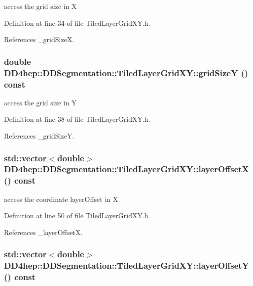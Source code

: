 access the grid size in X 

Definition at line 34 of file TiledLayerGridXY.h.

References \_\-gridSizeX.\hypertarget{class_d_d4hep_1_1_d_d_segmentation_1_1_tiled_layer_grid_x_y_a1e3d5ba29ff7da392441b974bc6c2c44}{
\subsubsection[{gridSizeY}]{\setlength{\rightskip}{0pt plus 5cm}double DD4hep::DDSegmentation::TiledLayerGridXY::gridSizeY () const}}
\label{class_d_d4hep_1_1_d_d_segmentation_1_1_tiled_layer_grid_x_y_a1e3d5ba29ff7da392441b974bc6c2c44}


access the grid size in Y 

Definition at line 38 of file TiledLayerGridXY.h.

References \_\-gridSizeY.\hypertarget{class_d_d4hep_1_1_d_d_segmentation_1_1_tiled_layer_grid_x_y_a6f4a84bfe3765e5c55b53b31996e2758}{
\subsubsection[{layerOffsetX}]{\setlength{\rightskip}{0pt plus 5cm}std::vector$<$double$>$ DD4hep::DDSegmentation::TiledLayerGridXY::layerOffsetX () const}}
\label{class_d_d4hep_1_1_d_d_segmentation_1_1_tiled_layer_grid_x_y_a6f4a84bfe3765e5c55b53b31996e2758}


access the coordinate layerOffset in X 

Definition at line 50 of file TiledLayerGridXY.h.

References \_\-layerOffsetX.\hypertarget{class_d_d4hep_1_1_d_d_segmentation_1_1_tiled_layer_grid_x_y_a805628a8e85ce9859fb86c64dfa45640}{
\subsubsection[{layerOffsetY}]{\setlength{\rightskip}{0pt plus 5cm}std::vector$<$double$>$ DD4hep::DDSegmentation::TiledLayerGridXY::layerOffsetY () const}}
\label{class_d_d4hep_1_1_d_d_segmentation_1_1_tiled_layer_grid_x_y_a805628a8e85ce9859fb86c64dfa45640}


